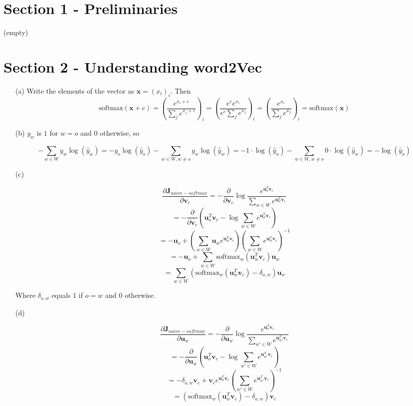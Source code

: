 \documentclass[12pt,letterpaper]{article}
\begin{document}
\section*{Section 1 - Preliminaries}

(empty)

\section*{Section 2 - Understanding word2Vec}

\begin{itemize}
    \item[(a)] Write the elements of the vector as $\mathbf{x} = (x_i)_i$. Then
    $$\text{softmax}(\mathbf{x} + c) = \left(\frac{e^{x_i + c}}{\sum_j e^{x_j + c}}\right)_i = \left(\frac{e^c e^{x_i}}{e^c \sum_j e^{x_j}}\right)_i = \left(\frac{e^{x_i}}{\sum_j e^{x_j}}\right)_i = \text{softmax}(\mathbf{x})$$
    \item[(b)]
    $y_w$ is $1$ for $w=o$ and $0$ otherwise, so
    
    $$- \sum_{w \in W}y_w \log(\hat{y}_w) = - y_o \log(\hat{y}_o) - \sum_{w \in W, w \neq o}y_w \log(\hat{y}_w) = - 1 \cdot \log(\hat{y}_o) - \sum_{w \in W, w \neq o}0 \cdot \log(\hat{y}_w) = - \log(\hat{y}_o)$$
    \item[(c)]
    
    $$\frac{\partial \mathbf{J}_{naive-softmax}}{\partial \mathbf{v}_c} = - \frac{\partial}{\partial \mathbf{v}_c} \log \frac{e^{\mathbf{u}_o^T \mathbf{v}_c}}{\sum_{w \in W} e^{\mathbf{u}_w^T \mathbf{v}_c}}$$
    $$= - \frac{\partial}{\partial \mathbf{v}_c} \left( \mathbf{u}_o^T \mathbf{v}_c - \log \sum_{w \in W} 
    e^{\mathbf{u}_w^T \mathbf{v}_c} \right)$$
    $$= - \mathbf{u}_o + \left(\sum_{w \in W} \mathbf{u}_w e^{\mathbf{u}_w^T \mathbf{v}_c} \right) \left( \sum_{w \in W} 
    e^{\mathbf{u}_w^T \mathbf{v}_c} \right)^{-1}$$
    $$= - \mathbf{u}_o + \sum_{w \in W} \text{softmax}_w(\mathbf{u}_w^T \mathbf{v}_c) \mathbf{u}_w $$
    $$=\sum_{w \in W} (\text{softmax}_w(\mathbf{u}_w^T \mathbf{v}_c) - \delta_{o, w}) \mathbf{u}_w $$
    
    Where $\delta_{o,w}$ equals $1$ if $o = w$ and $0$ otherwise.
    
    \item[(d)]
    
    $$\frac{\partial \mathbf{J}_{naive-softmax}}{\partial \mathbf{u}_w} = - \frac{\partial}{\partial \mathbf{u}_w} \log \frac{e^{\mathbf{u}_o^T \mathbf{v}_c}}{\sum_{w' \in W} e^{\mathbf{u}_{w'}^T \mathbf{v}_c}}$$
    $$= - \frac{\partial}{\partial \mathbf{u}_w} \left( \mathbf{u}_o^T \mathbf{v}_c - \log \sum_{w' \in W} e^{\mathbf{u}_{w'}^T \mathbf{v}_c} \right)$$
    $$= -\delta_{o,w}\mathbf{v}_c + \mathbf{v}_c e^{\mathbf{u}_w^T \mathbf{v}_c} \left( \sum_{w' \in W} e^{\mathbf{u}_{w'}^T \mathbf{v}_c} \right)^{-1}$$
    $$= (\text{softmax}_w(\mathbf{u}_w^T \mathbf{v}_c)-\delta_{o,w})\mathbf{v}_c$$
    

\end{itemize}
\end{document}
